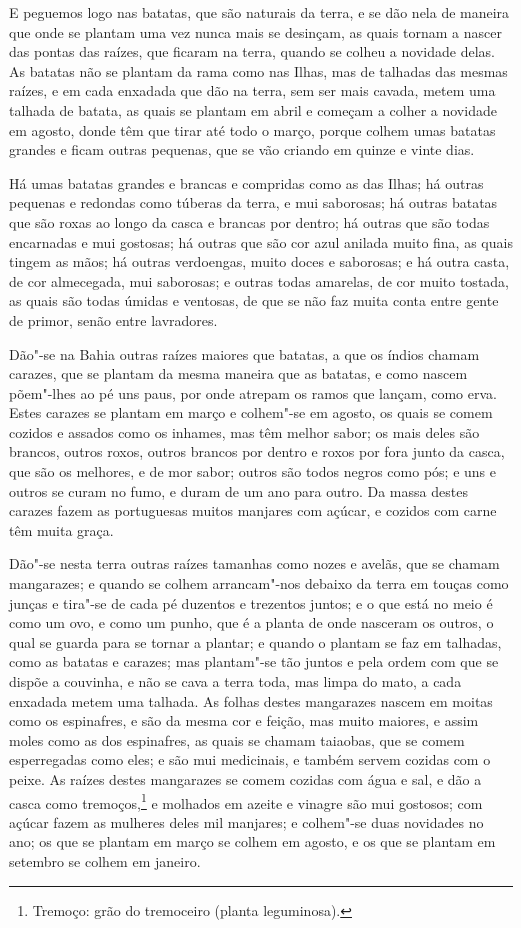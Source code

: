 \begin{linenumbers}
E peguemos logo nas batatas, que são naturais da terra, e se dão nela de maneira que onde
se plantam uma vez nunca mais se desinçam, as quais tornam a nascer das pontas das raízes,
que ficaram na terra, quando se colheu a novidade delas. As batatas não se plantam da rama
como nas Ilhas, mas de talhadas das mesmas raízes, e em cada enxadada que dão na terra,
sem ser mais cavada, metem uma talhada de batata, as quais se plantam em abril e começam a
colher a novidade em agosto, donde têm que tirar até todo o março, porque colhem umas
batatas grandes e ficam outras pequenas, que se vão criando em quinze e vinte dias.

Há umas batatas grandes e brancas e compridas como as das Ilhas; há outras pequenas e
redondas como túberas da terra, e mui saborosas; há outras batatas que são roxas ao longo
da casca e brancas por dentro; há outras que são todas encarnadas e mui gostosas; há
outras que são cor azul anilada muito fina, as quais tingem as mãos; há outras verdoengas,
muito doces e saborosas; e há outra casta, de cor almecegada, mui saborosas; e outras
todas amarelas, de cor muito tostada, as quais são todas úmidas e ventosas, de que se não
faz muita conta entre gente de primor, senão entre lavradores.

Dão"-se na Bahia outras raízes maiores que batatas, a que os índios chamam carazes, que se
plantam da mesma maneira que as batatas, e como nascem põem"-lhes ao pé uns paus, por onde
atrepam os ramos que lançam, como erva. Estes carazes se plantam em março e colhem"-se em
agosto, os quais se comem cozidos e assados como os inhames, mas têm melhor sabor; os mais
deles são brancos, outros roxos, outros brancos por dentro e roxos por fora junto da
casca, que são os melhores, e de mor sabor; outros são todos negros como pós; e uns e
outros se curam no fumo, e duram de um ano para outro. Da massa destes carazes fazem as
portuguesas muitos manjares com açúcar, e cozidos com carne têm muita graça.

Dão"-se nesta terra outras raízes tamanhas como nozes e avelãs, que se chamam mangarazes; e
quando se colhem arrancam"-nos debaixo da terra em touças como junças e tira"-se de cada pé
duzentos e trezentos juntos; e o que está no meio é como um ovo, e como um punho, que é a
planta de onde nasceram os outros, o qual se guarda para se tornar a plantar; e quando o
plantam se faz em talhadas, como as batatas e carazes; mas plantam"-se tão juntos e pela
ordem com que se dispõe a couvinha, e não se cava a terra toda, mas limpa do mato, a cada
enxadada metem uma talhada. As folhas destes mangarazes nascem em moitas como os
espinafres, e são da mesma cor e feição, mas muito maiores, e assim moles como as dos
espinafres, as quais se chamam taiaobas, que se comem esperregadas como eles; e são mui
medicinais, e também servem cozidas com o peixe. As raízes destes mangarazes se comem
cozidas com água e sal, e dão a casca como tremoços,\footnote{ Tremoço: grão do tremoceiro
(planta leguminosa).} e molhados em azeite e vinagre são mui gostosos; com açúcar fazem as
mulheres deles mil manjares; e colhem"-se duas novidades no ano; os que se plantam em março
se colhem em agosto, e os que se plantam em setembro se colhem em janeiro.


\end{linenumbers}
